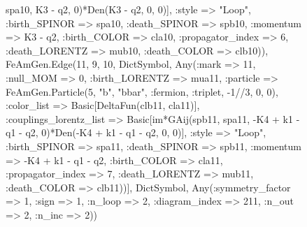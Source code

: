\documentclass{revtex4}
\begin{document}
\begin{figure}[!htb]
\begin{center}
{spa10, K3 - q2, 0)*Den(K3 - q2, 0, 0)], :style => "Loop", :birth_SPINOR => spa10, :death_SPINOR => spb10, :momentum => K3 - q2, :birth_COLOR => cla10, :propagator_index => 6, :death_LORENTZ => mub10, :death_COLOR => clb10)), FeAmGen.Edge(11, 9, 10, Dict{Symbol, Any}(:mark => 11, :null_MOM => 0, :birth_LORENTZ => mua11, :particle => FeAmGen.Particle(5, "b", "bbar", :fermion, :triplet, -1//3, 0, 0), :color_list => Basic[DeltaFun(clb11, cla11)], :couplings_lorentz_list => Basic[im*GAij(spb11, spa11, -K4 + k1 - q1 - q2, 0)*Den(-K4 + k1 - q1 - q2, 0, 0)], :style => "Loop", :birth_SPINOR => spa11, :death_SPINOR => spb11, :momentum => -K4 + k1 - q1 - q2, :birth_COLOR => cla11, :propagator_index => 7, :death_LORENTZ => mub11, :death_COLOR => clb11))], Dict{Symbol, Any}(:symmetry_factor => 1, :sign => 1, :n_loop => 2, :diagram_index => 211, :n_out => 2, :n_inc => 2)) 
}
\end{center}
\end{figure}
\end{document}

